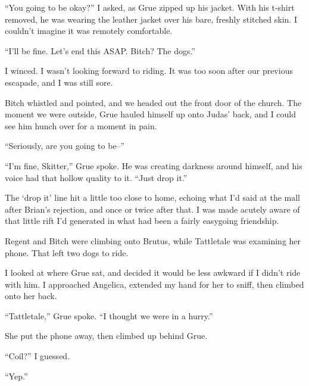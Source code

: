 





``You going to be okay?'' I asked, as Grue zipped up his jacket.  With his t-shirt removed, he was wearing the leather jacket over his bare, freshly stitched skin.  I couldn't imagine it was remotely comfortable.



``I'll be fine.  Let's end this ASAP.  Bitch?  The dogs.''



I winced.  I wasn't looking forward to riding.  It was too soon after our previous escapade, and I was still sore.



Bitch whistled and pointed, and we headed out the front door of the church.  The moment we were outside, Grue hauled himself up onto Judas' back, and I could see him hunch over for a moment in pain.



``Seriously, are you going to be--''



``I'm fine, Skitter,'' Grue spoke.  He was creating darkness around himself, and his voice had that hollow quality to it.  ``Just drop it.''



The `drop it' line hit a little too close to home, echoing what I'd said at the mall after Brian's rejection, and once or twice after that.  I was made acutely aware of that little rift I'd generated in what had been a fairly easygoing friendship.



Regent and Bitch were climbing onto Brutus, while Tattletale was examining her phone.  That left two dogs to ride.



I looked at where Grue sat, and decided it would be less awkward if I didn't ride with him.  I approached Angelica, extended my hand for her to sniff, then climbed onto her back.



``Tattletale,'' Grue spoke.  ``I thought we were in a hurry.''



She put the phone away, then climbed up behind Grue.



``Coil?'' I guessed.



``Yep.''



